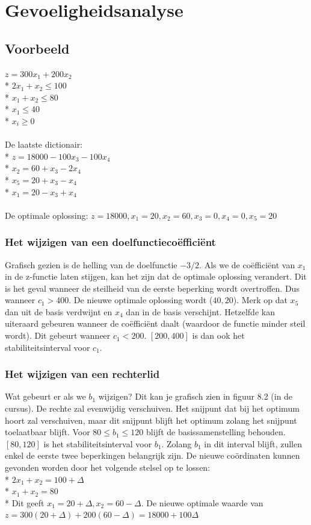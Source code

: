 \documentclass[10pt]{article}
\begin{document}
\section{Gevoeligheidsanalyse}
\subsection{Voorbeeld}
$z = 300x_1 + 200x_2$\\*
$2x_1 + x_2 \le 100$\\*
$x_1 + x_2 \le 80$\\*
$x_1 \le 40$\\*
$x_i \ge 0$\\\\
De laatste dictionair:\\*
$z = 18000 - 100x_3 - 100x_4$\\*
$x_2 = 60 + x_3 - 2x_4$\\*
$x_5 = 20 + x_3 - x_4$\\*
$x_1 = 20 - x_3 + x_4$\\\\
De optimale oplossing: $z = 18000, x_1 = 20, x_2 = 60, x_3 = 0, x_4 = 0, x_5 = 20$
\subsubsection{Het wijzigen van een doelfunctieco\"effici\"ent}
Grafisch gezien is de helling van de doelfunctie $-3/2$. Als we de co\"effici\"ent van $x_1$ in de z-functie laten stijgen, kan het zijn dat de optimale oplossing verandert. Dit is het geval wanneer de steilheid van de eerste beperking wordt overtroffen. Dus wanneer $c_1 > 400$. De nieuwe optimale oplossing wordt ($40, 20$). Merk op dat $x_5$ dan uit de basis verdwijnt en $x_4$ dan in de basis verschijnt. Hetzelfde kan uiteraard gebeuren wanneer de co\"effici\"ent daalt (waardoor de functie minder steil wordt). Dit gebeurt wanneer $c_1 < 200$. $[200, 400]$ is dan ook het stabiliteitsinterval voor $c_1$.
\subsubsection{Het wijzigen van een rechterlid}
Wat gebeurt er als we $b_1$ wijzigen? Dit kan je grafisch zien in figuur 8.2 (in de cursus). De rechte zal evenwijdig verschuiven. Het snijpunt dat bij het optimum hoort zal verschuiven, maar dit snijpunt blijft het optimum zolang het snijpunt toelaatbaar blijft. Voor $80 \le b_1 \le 120$ blijft de basissamenstelling behouden. $[80, 120]$ is het stabiliteitsinterval voor $b_1$. Zolang $b_1$ in dit interval blijft, zullen enkel de eerste twee beperkingen belangrijk zijn. De nieuwe co\"ordinaten kunnen gevonden worden door het volgende stelsel op te lossen:\\*
$2x_1 + x_2 = 100 + \Delta$\\*
$x_1 + x_2 = 80$\\*
Dit geeft $x_1 = 20 + \Delta, x_2 = 60 - \Delta$. De nieuwe optimale waarde van $z = 300(20+\Delta)+200(60-\Delta) = 18000+100\Delta$
\end{document}
